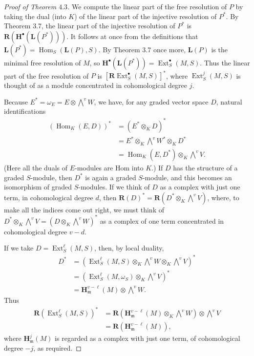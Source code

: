 \documentclass{tran-l}
\newcommand{\myHom}{\operatorname{Hom}}
\newcommand{\Ext}{{\operatorname{Ext}}}
\newcommand{\myH}{\mathbf{H}}
\newcommand{\LL}{\mathbf{L}}
\newcommand{\RR}{\mathbf{R}}
\newcommand{\gm}{{\mathfrak{m}}}
\theoremstyle{plain}
\theoremstyle{remark}
\theoremstyle{definition}
\begin{document}
\begin{proof}[Proof of Theorem $4.3$] We compute the linear part of the free resolution of $P$ by
taking the dual (into $K$) of the linear part of the injective
resolution of $P^{*}$.
By Theorem 3.7, the linear part of the injective resolution
of $P^{*}$ is $\RR (\myH ^{\bullet }(\LL (P^{*})))$.
It follows at once from
the definitions that $\LL (P^{*})=\myHom _{S}(\LL (P), S)$.
By Theorem 3.7 once more,  $\LL (P)$ is the minimal free resolution
of $M$, so
$\myH ^{\bullet }(\LL (P^{*}))=\Ext _{S}^{\bullet }(M,S)$.
 Thus
the linear part of the free resolution of $P$ is
$[\RR \Ext _{S}^{\bullet }(M,S)]^{*}$, where $\Ext _{S}^{j}(M,S)$ is
thought of as a module concentrated in cohomological degree
$j$.

Because $E^{*}=\omega _{E}=E\otimes \bigwedge ^{v}W$, we have, for
any graded vector space $D$, natural
identifications
\begin{equation*}\begin{split}
(\myHom _{K}(E,D))^{*}
&=(E^{*}\otimes _{K}D)^{*}\\
&=E^{*}\otimes _{K} \textstyle{\bigwedge ^{v}}W^{*} \otimes _{K}D^{*}\\
&=\myHom _{K}(E,D^{*})\otimes _{K}\textstyle{\bigwedge ^{v}}V.\end{split}
\end{equation*}
(Here all the duals of $E$-modules are Hom into $K$.) If $D$
has the structure of a graded $S$-module, then
$D^{*}$ is again a graded $S$-module, and this becomes  an
isomorphism of graded $S$-modules. If we think of
$D$ as a complex with just one term, in cohomological degree
$d$, then
$\RR (D)^{*}=\RR (D^{*}\otimes _{K}\bigwedge ^{v}V)$, where, to make
all the indices come out right, we must think of
$D^{*}\otimes _{K} \bigwedge ^{v}V=(D\otimes _{K}\bigwedge ^{v}W)^{*}$ as a complex of one
term concentrated in cohomological degree $v-d$.

If we take $D=\Ext _{S}^{\ell }(M,S)$, then, by local duality,
\begin{equation*}\begin{split}
D^{*}&=(\Ext _{S}^{\ell }(M,S)\otimes _{K}\textstyle{\bigwedge ^{v}}
W\otimes _{K} \textstyle{\bigwedge ^{v}}V)^{*}\\
&=(\Ext _{S}^{\ell }(M,\omega _{S})\otimes _{K} \textstyle{\bigwedge ^{v}}
V)^{*}\\
&=\myH ^{v-\ell }_{\gm }(M)\otimes \textstyle{\bigwedge ^{v}}W.\end{split}
\end{equation*}
Thus
\begin{equation*}\begin{split}
\RR (\Ext _{S}^{\ell }(M,S))^{*}&=\RR (\myH ^{v-\ell }_{\gm }(M)
                         \otimes _{K}\textstyle{\bigwedge ^{v}}
W)\otimes \textstyle{\bigwedge ^{v}}V\\
&=\RR (\myH ^{v-\ell }_{\gm }(M)),
\end{split}
\end{equation*}
where $\myH ^{j}_{\gm }(M)$
is regarded as a complex with just one term, of
cohomological degree $-j$, as required.\end{proof}
\end{document}

